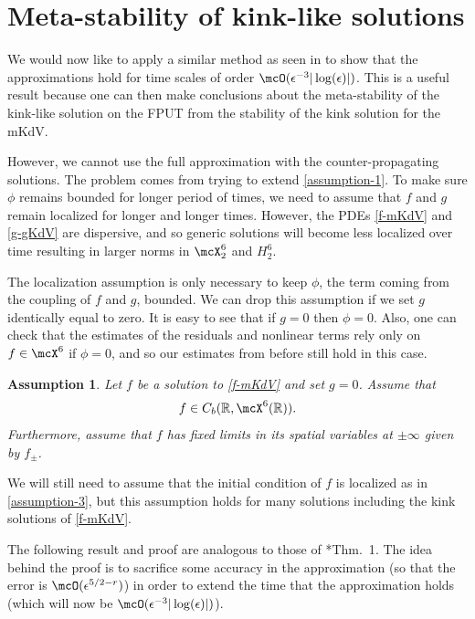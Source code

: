 \documentclass[oneside,reqno]{amsart}
\newcommand{\R}{\mathbb{R}}
\newtheorem{assum}{Assumption}
\begin{document}
\section{Meta-stability of kink-like solutions}\label{sec:meta}

We would now like to apply a similar method as seen in \cite{khan2017long} to show that the approximations hold for time scales of order \(\mcO(\epsilon^{-3}|\log(\epsilon)|)\). This is a useful result because one can then make conclusions about the meta-stability of the kink-like solution on the FPUT from the stability of the kink solution for the mKdV. 

However, we cannot use the full approximation with the counter-propagating solutions. The problem comes from trying to extend \cref{assumption-1}. To make sure \(\phi\) remains bounded for longer period of times, we need to assume that \(f\) and \(g\) remain localized for longer and longer times. However, the PDEs \cref{f-mKdV} and \cref{g-gKdV} are dispersive, and so generic solutions will become less localized over time resulting in larger norms in \(\mcX^6_2\) and \(H^6_2\).

The localization assumption is only necessary to keep \(\phi\), the term coming from the coupling of \(f\) and \(g\), bounded. We can drop this assumption if we set \(g\) identically equal to zero. It is easy to see that if \(g=0\) then \(\phi = 0\). Also, one can check that the estimates of the residuals and nonlinear terms rely only on \(f \in \mcX^6\) if \(\phi = 0\), and so our estimates from before still hold in this case.

\begin{assum}\label{assumption-4}
	Let \(f\) be a solution to \cref{f-mKdV} and set \(g = 0\). Assume that 
	\begin{equation*}
		f \in C_b(\R, \mcX^6(\R)).
	\end{equation*}
	Furthermore, assume that \(f\) has fixed limits in its spatial variables at \(\pm \infty\) given by \(f_{\pm}\).
\end{assum}

We will still need to assume that the initial condition of \(f\) is localized as in \cref{assumption-3}, but this assumption holds for many solutions including the kink solutions of \cref{f-mKdV}.

The following result and proof are analogous to those of \cite{khan2017long}*{Thm.~1}. The idea behind the proof is to sacrifice some accuracy in the approximation (so that the error is \(\mcO(\epsilon^{5/2 - r})\)) in order to extend the time that the approximation holds (which will now be \(\mcO(\epsilon^{-3} |\log(\epsilon)|)\)).
\end{document}
